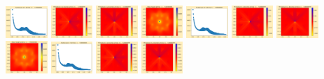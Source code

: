 \documentclass[11pt]{article}
\begin{document}
\includegraphics[width=0.11875\textwidth]{frame0057fig1.png}
\includegraphics[width=0.11875\textwidth]{frame0057fig2.png}
\includegraphics[width=0.11875\textwidth]{frame0057fig3.png}
\vskip 10pt 
\includegraphics[width=0.11875\textwidth]{frame0058fig0.png}
\includegraphics[width=0.11875\textwidth]{frame0058fig1.png}
\includegraphics[width=0.11875\textwidth]{frame0058fig2.png}
\includegraphics[width=0.11875\textwidth]{frame0058fig3.png}
\includegraphics[width=0.11875\textwidth]{frame0059fig0.png}
\includegraphics[width=0.11875\textwidth]{frame0059fig1.png}
\includegraphics[width=0.11875\textwidth]{frame0059fig2.png}
\includegraphics[width=0.11875\textwidth]{frame0059fig3.png}
\end{document}
